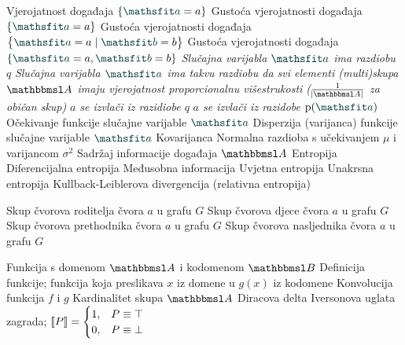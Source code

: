  {Vjerojatnost događaja $\cbr{\rvar a=a}$}
 {Gustoća vjerojatnosti događaja $\cbr{\rvar a=a}$}
 {Gustoća vjerojatnosti događaja $\cbr{\rvar a=a\mid\rvar b=b}$}
 {Gustoća vjerojatnosti događaja $\cbr{\rvar a=a,\rvar b=b}$}
 {\textit{Slučajna varijabla $\rvar a$ ima razdiobu $q$}}
 	{\textit{Slučajna varijabla $\rvar a$ ima takvu razdiobu da svi elementi (multi)skupa $\set A$ imaju vjerojatnost proporcionalnu višestrukosti ($\frac{1}{\envert{\set A}}$ za običan skup)}}
 {\textit{$a$ se izvlači iz razidiobe $q$}}
 {\textit{$a$ se izvlači iz razidobe $\p(\rvar a)$}}
 {Očekivanje funkcije slučajne varijable $\rvar a$}
 {Disperzija (varijanca) funkcije slučajne varijable $\rvar a$}
		{Kovarijanca}
 {Normalna razdioba s učekivanjem $\mu$ i varijancom $\sigma^2$}
			{Sadržaj informacije događaja $\set A$}
			{Entropija}
			{Diferencijalna entropija}
	  {Međusobna informacija}
 {Uvjetna entropija}
 {Unakrsna entropija}
 {Kullback-Leiblerova divergencija (relativna entropija)}

	{Skup čvorova roditelja čvora $a$ u grafu $G$}
	{Skup čvorova djece čvora $a$ u grafu $G$}
	{Skup čvorova prethodnika čvora $a$ u grafu $G$}
	{Skup čvorova nasljednika čvora $a$ u grafu $G$}


 {Funkcija s domenom $\set A$ i kodomenom $\set B$}
 {Definicija funkcije; funkcija koja preslikava $x$ iz domene u $g(x)$ iz kodomene}
	{Konvolucija funkcija $f$ i $g$}
	{Kardinalitet skupa $\set A$}
	{Diracova delta}
 {Iversonova uglata zagrada; $\enbbracket{P}=\begin{cases} 1, & P \equiv \top \\ 0, & P \equiv \bot \end{cases}$}
